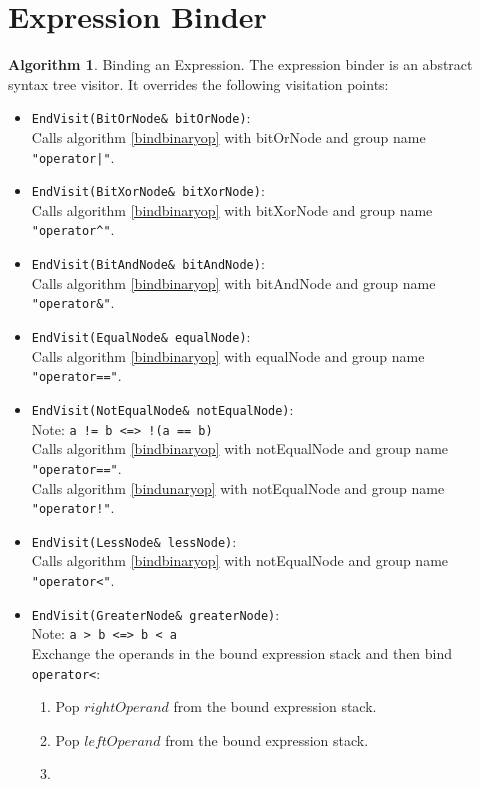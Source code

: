 \documentclass[a4paper,oneside,11pt]{book}
\theoremstyle{definition}
\newtheorem{algo}{Algorithm}[section]
\begin{document}
\section{Expression Binder}

\begin{algo} Binding an Expression.
The expression binder is an abstract syntax tree visitor.
It overrides the following visitation points:
\begin{itemize}
\item
\verb|EndVisit(BitOrNode& bitOrNode)|:\\
Calls algorithm \ref{bindbinaryop} with bitOrNode and group name \verb+"operator|"+.
\item
\verb|EndVisit(BitXorNode& bitXorNode)|:\\
Calls algorithm \ref{bindbinaryop} with bitXorNode and group name \verb|"operator^"|.
\item
\verb|EndVisit(BitAndNode& bitAndNode)|:\\
Calls algorithm \ref{bindbinaryop} with bitAndNode and group name \verb|"operator&"|.
\item
\verb|EndVisit(EqualNode& equalNode)|:\\
Calls algorithm \ref{bindbinaryop} with equalNode and group name \verb|"operator=="|.
\item
\verb|EndVisit(NotEqualNode& notEqualNode)|:\\
Note: \verb|a != b <=> !(a == b)|\\
Calls algorithm \ref{bindbinaryop} with notEqualNode and group name \verb|"operator=="|.\\
Calls algorithm \ref{bindunaryop} with notEqualNode and group name \verb|"operator!"|.\\
\item
\verb|EndVisit(LessNode& lessNode)|:\\
Calls algorithm \ref{bindbinaryop} with notEqualNode and group name \verb|"operator<"|.\\
\item
\verb|EndVisit(GreaterNode& greaterNode)|:\\
Note: \verb|a > b <=> b < a|\\
Exchange the operands in the bound expression stack and then bind \verb|operator<|:
\begin{enumerate}
\item
Pop $rightOperand$ from the bound expression stack.
\item
Pop $leftOperand$ from the bound expression stack.
\item

\end{enumerate}
\end{itemize}
\end{algo}
\end{document}
